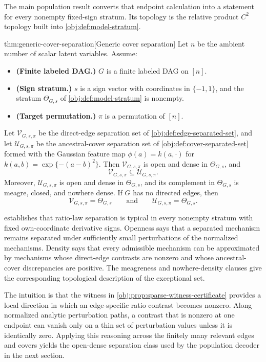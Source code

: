 \documentclass[11pt]{article}
\begin{document}
The main population result converts that endpoint calculation into a statement for every nonempty fixed-sign stratum. Its topology is the relative product \(C^2\) topology built into \cref{obj:def:model-stratum}.

\begin{theoremv}{thm:generic-cover-separation}[Generic cover separation]
Let \(n\) be the ambient number of scalar latent variables. Assume:
\begin{itemize}
\item \textbf{(Finite labeled DAG.)} \(G\) is a finite labeled DAG on \([n]\).
\item \textbf{(Sign stratum.)} \(s\) is a sign vector with coordinates in \(\{-1,1\}\), and the stratum \(\Theta_{G,s}\) of \cref{obj:def:model-stratum} is nonempty.
\item \textbf{(Target permutation.)} \(\pi\) is a permutation of \([n]\).
\end{itemize}
Let \(\mathcal V_{G,s,\pi}\) be the direct-edge separation set of \cref{obj:def:edge-separated-set}, and let \(\mathcal U_{G,s,\pi}\) be the ancestral-cover separation set of \cref{obj:def:cover-separated-set} formed with the Gaussian feature map \(\phi(a)=k(a,\cdot)\) for \(k(a,b)=\exp\{-(a-b)^2\}\). Then \(\mathcal V_{G,s,\pi}\) is open and dense in \(\Theta_{G,s}\), and
\[
\mathcal V_{G,s,\pi}\subseteq \mathcal U_{G,s,\pi}.
\]
Moreover, \(\mathcal U_{G,s,\pi}\) is open and dense in \(\Theta_{G,s}\), and its complement in \(\Theta_{G,s}\) is meagre, closed, and nowhere dense. If \(G\) has no directed edges, then
\[
\mathcal V_{G,s,\pi}=\Theta_{G,s}
\qquad\text{and}\qquad
\mathcal U_{G,s,\pi}=\Theta_{G,s}.
\]
\end{theoremv}

 establishes that ratio-law separation is typical in every nonempty stratum with fixed own-coordinate derivative signs. Openness says that a separated mechanism remains separated under sufficiently small perturbations of the normalized mechanisms. Density says that every admissible mechanism can be approximated by mechanisms whose direct-edge contrasts are nonzero and whose ancestral-cover discrepancies are positive. The meagreness and nowhere-density clauses give the corresponding topological description of the exceptional set.

The intuition is that the witness in \cref{obj:prop:sparse-witness-certificate} provides a local direction in which an edge-specific ratio contrast becomes nonzero. Along normalized analytic perturbation paths, a contrast that is nonzero at one endpoint can vanish only on a thin set of perturbation values unless it is identically zero. Applying this reasoning across the finitely many relevant edges and covers yields the open-dense separation class used by the population decoder in the next section.
\end{document}
